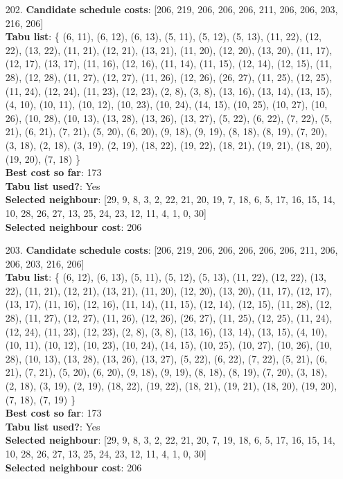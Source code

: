 \documentclass[fleqn]{article}
\begin{document}
\begin{itemize}
    \item[202.] \textbf{Candidate schedule costs}: [206, 219, 206, 206, 206, 211, 206, 206, 203, 216, 206] \\
    \textbf{Tabu list}: \{ (6, 11), (6, 12), (6, 13), (5, 11), (5, 12), (5, 13), (11, 22), (12, 22), (13, 22), (11, 21), (12, 21), (13, 21), (11, 20), (12, 20), (13, 20), (11, 17), (12, 17), (13, 17), (11, 16), (12, 16), (11, 14), (11, 15), (12, 14), (12, 15), (11, 28), (12, 28), (11, 27), (12, 27), (11, 26), (12, 26), (26, 27), (11, 25), (12, 25), (11, 24), (12, 24), (11, 23), (12, 23), (2, 8), (3, 8), (13, 16), (13, 14), (13, 15), (4, 10), (10, 11), (10, 12), (10, 23), (10, 24), (14, 15), (10, 25), (10, 27), (10, 26), (10, 28), (10, 13), (13, 28), (13, 26), (13, 27), (5, 22), (6, 22), (7, 22), (5, 21), (6, 21), (7, 21), (5, 20), (6, 20), (9, 18), (9, 19), (8, 18), (8, 19), (7, 20), (3, 18), (2, 18), (3, 19), (2, 19), (18, 22), (19, 22), (18, 21), (19, 21), (18, 20), (19, 20), (7, 18) \} \\
    \textbf{Best cost so far}: 173 \\
    \textbf{Tabu list used?}: Yes \\
    \textbf{Selected neighbour}: [29, 9, 8, 3, 2, 22, 21, 20, 19, 7, 18, 6, 5, 17, 16, 15, 14, 10, 28, 26, 27, 13, 25, 24, 23, 12, 11, 4, 1, 0, 30] \\
    \textbf{Selected neighbour cost}: 206
      

    \item[203.] \textbf{Candidate schedule costs}: [206, 219, 206, 206, 206, 206, 206, 211, 206, 206, 203, 216, 206] \\
    \textbf{Tabu list}: \{ (6, 12), (6, 13), (5, 11), (5, 12), (5, 13), (11, 22), (12, 22), (13, 22), (11, 21), (12, 21), (13, 21), (11, 20), (12, 20), (13, 20), (11, 17), (12, 17), (13, 17), (11, 16), (12, 16), (11, 14), (11, 15), (12, 14), (12, 15), (11, 28), (12, 28), (11, 27), (12, 27), (11, 26), (12, 26), (26, 27), (11, 25), (12, 25), (11, 24), (12, 24), (11, 23), (12, 23), (2, 8), (3, 8), (13, 16), (13, 14), (13, 15), (4, 10), (10, 11), (10, 12), (10, 23), (10, 24), (14, 15), (10, 25), (10, 27), (10, 26), (10, 28), (10, 13), (13, 28), (13, 26), (13, 27), (5, 22), (6, 22), (7, 22), (5, 21), (6, 21), (7, 21), (5, 20), (6, 20), (9, 18), (9, 19), (8, 18), (8, 19), (7, 20), (3, 18), (2, 18), (3, 19), (2, 19), (18, 22), (19, 22), (18, 21), (19, 21), (18, 20), (19, 20), (7, 18), (7, 19) \} \\
    \textbf{Best cost so far}: 173 \\
    \textbf{Tabu list used?}: Yes \\
    \textbf{Selected neighbour}: [29, 9, 8, 3, 2, 22, 21, 20, 7, 19, 18, 6, 5, 17, 16, 15, 14, 10, 28, 26, 27, 13, 25, 24, 23, 12, 11, 4, 1, 0, 30] \\
    \textbf{Selected neighbour cost}: 206
      


\end{itemize}
\end{document}
